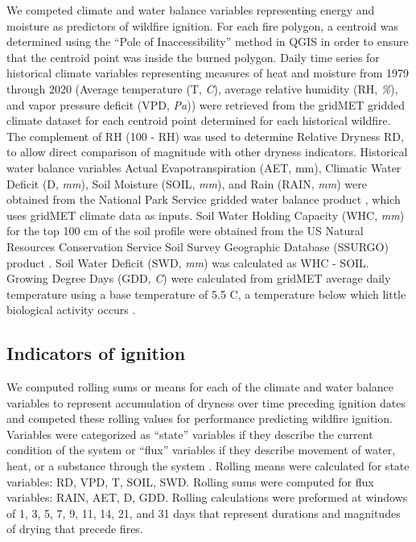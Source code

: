 \documentclass[11p]{article}
\begin{document}

We competed climate and water balance variables representing energy and moisture as predictors of wildfire ignition. For each fire polygon, a centroid was determined using the ``Pole of Inaccessibility'' method in QGIS \citep{QGIS_software} in order to ensure that the centroid point was inside the burned polygon. Daily time series for historical climate variables representing measures of heat and moisture from 1979 through 2020 (Average temperature (T, \textit{\degree C}), average relative humidity (RH, \textit{\%}), and vapor pressure deficit (VPD, \textit{Pa})) were retrieved from the gridMET gridded climate dataset \citep{abatzoglouDevelopmentGriddedSurface2013} for each centroid point determined for each historical wildfire. The complement of RH (100 - RH) was used to determine Relative Dryness RD, to allow direct comparison of magnitude with other dryness indicators. Historical water balance variables Actual Evapotranspiration (AET, mm), Climatic Water Deficit (D, \textit{mm}), Soil Moisture (SOIL, \textit{mm}), and Rain (RAIN, \textit{mm}) were obtained from the National Park Service gridded water balance product \citep{tercekHistoricalChangesPlant2021}, which uses gridMET climate data as inputs. Soil Water Holding Capacity (WHC, \textit{mm}) for the top 100 cm of the soil profile were obtained from the US Natural Resources Conservation Service 
Soil Survey Geographic Database (SSURGO) product \citep{naturalresourcesconservationserviceSoilSurveyGeographic2015}. Soil Water Deficit (SWD, \textit{mm}) was calculated as WHC - SOIL. Growing Degree Days (GDD, \textit{\degree C}) were calculated from gridMET average daily temperature using a base temperature of 5.5 \degree C, a temperature below which little biological activity occurs \citep{mcmasterGrowingDegreedaysOne1997}. 

\subsection{Indicators of ignition}

We computed rolling sums or means for each of the climate and water balance variables to represent accumulation of dryness over time preceding ignition dates and competed these rolling values for performance predicting wildfire ignition. Variables were categorized as ``state'' variables if they describe the current condition of the system or ``flux'' variables if they describe movement of water, heat, or a substance through the system \citep{wangInterplaysStateFlux2019,dingmanPhysicalHydrology2015}. Rolling means were calculated for state variables: RD, VPD, T, SOIL, SWD. Rolling sums were computed for flux variables: RAIN, AET, D, GDD. Rolling calculations were preformed at windows of 1, 3, 5, 7, 9, 11, 14, 21, and 31 days that represent durations and magnitudes of drying that precede fires.
\end{document}
